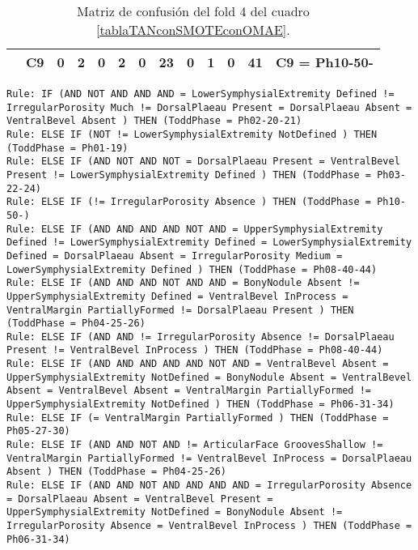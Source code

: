 \begin{table}[H]
{\begin{tabular}{|ccrrrrrrrrrrc|}
\multicolumn{1}{|c|}{}                                      & \multicolumn{1}{c|}{C9} & \multicolumn{1}{c|}{0}  & \multicolumn{1}{c|}{\textbf{2}}  & \multicolumn{1}{c|}{0}  & \multicolumn{1}{c|}{\textbf{2}}  & \multicolumn{1}{c|}{0}  & \multicolumn{1}{c|}{\textbf{23}} & \multicolumn{1}{c|}{0}  & \multicolumn{1}{c|}{\textbf{1}}  & \multicolumn{1}{c|}{0}  & \multicolumn{1}{c|}{\textbf{41}} & C9 = Ph10-50-     \\ \hline
\end{tabular}%
}
\caption{Matriz de confusión del fold 4 del cuadro \ref{tablaTANconSMOTEconOMAE}.}
\end{table}

\begin{lstlisting}
Rule: IF (AND NOT AND AND AND = LowerSymphysialExtremity Defined != IrregularPorosity Much != DorsalPlaeau Present = DorsalPlaeau Absent = VentralBevel Absent ) THEN (ToddPhase = Ph02-20-21)
Rule: ELSE IF (NOT != LowerSymphysialExtremity NotDefined ) THEN (ToddPhase = Ph01-19)
Rule: ELSE IF (AND NOT AND NOT = DorsalPlaeau Present = VentralBevel Present != LowerSymphysialExtremity Defined ) THEN (ToddPhase = Ph03-22-24)
Rule: ELSE IF (!= IrregularPorosity Absence ) THEN (ToddPhase = Ph10-50-)
Rule: ELSE IF (AND AND AND AND NOT AND = UpperSymphysialExtremity Defined != LowerSymphysialExtremity Defined = LowerSymphysialExtremity Defined = DorsalPlaeau Absent = IrregularPorosity Medium = LowerSymphysialExtremity Defined ) THEN (ToddPhase = Ph08-40-44)
Rule: ELSE IF (AND AND AND NOT AND AND = BonyNodule Absent != UpperSymphysialExtremity Defined = VentralBevel InProcess = VentralMargin PartiallyFormed != DorsalPlaeau Present ) THEN (ToddPhase = Ph04-25-26)
Rule: ELSE IF (AND AND != IrregularPorosity Absence != DorsalPlaeau Present != VentralBevel InProcess ) THEN (ToddPhase = Ph08-40-44)
Rule: ELSE IF (AND AND AND AND AND NOT AND = VentralBevel Absent = UpperSymphysialExtremity NotDefined = BonyNodule Absent = VentralBevel Absent = VentralBevel Absent = VentralMargin PartiallyFormed != UpperSymphysialExtremity NotDefined ) THEN (ToddPhase = Ph06-31-34)
Rule: ELSE IF (= VentralMargin PartiallyFormed ) THEN (ToddPhase = Ph05-27-30)
Rule: ELSE IF (AND AND NOT AND != ArticularFace GroovesShallow != VentralMargin PartiallyFormed != VentralBevel InProcess = DorsalPlaeau Absent ) THEN (ToddPhase = Ph04-25-26)
Rule: ELSE IF (AND AND NOT AND AND AND AND = IrregularPorosity Absence = DorsalPlaeau Absent = VentralBevel Present = UpperSymphysialExtremity NotDefined = BonyNodule Absent != IrregularPorosity Absence = VentralBevel InProcess ) THEN (ToddPhase = Ph06-31-34)

\end{lstlisting}
